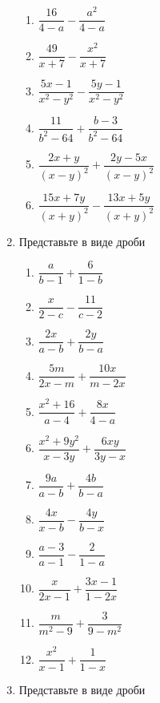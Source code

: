 \documentclass[10pt, a4paper]{article}
\begin{document}
\begin{enumerate}
	\begin{multicols}{3}
		\begin{enumerate}
			\item $\dfrac{16}{4-a}-\dfrac{a^2}{4-a}$ 
			\item $\dfrac{49}{x+7}-\dfrac{x^2}{x+7}$ 
			\item $\dfrac{5x-1}{x^2-y^2}-\dfrac{5y-1}{x^2-y^2}$ 
			\item $\dfrac{11}{b^2-64}+\dfrac{b-3}{b^2-64}$ 
			\item $\dfrac{2x+y}{(x-y)^2}+\dfrac{2y-5x}{(x-y)^2}$ 
			\item $\dfrac{15x+7y}{(x+y)^2}-\dfrac{13x+5y}{(x+y)^2}$ 
		\end{enumerate}	
	\end{multicols}
	\item Представьте в виде дроби
	\begin{multicols}{3}
		\begin{enumerate}
			\item $\dfrac{a}{b-1}+\dfrac{6}{1-b}$ 
			\item $\dfrac{x}{2-c}-\dfrac{11}{c-2}$ 
			\item $\dfrac{2x}{a-b}+\dfrac{2y}{b-a}$ 
			\item $\dfrac{5m}{2x-m}+\dfrac{10x}{m-2x}$ 
			\item $\dfrac{x^2+16}{a-4}+\dfrac{8x}{4-a}$ 
			\item $\dfrac{x^2+9y^2}{x-3y}+\dfrac{6xy}{3y-x}$ 
			\item $\dfrac{9a}{a-b}+\dfrac{4b}{b-a}$ 
			\item $\dfrac{4x}{x-b}-\dfrac{4y}{b-x}$ 
			\item $\dfrac{a-3}{a-1}-\dfrac{2}{1-a}$ 
			\item $\dfrac{x}{2x-1}+\dfrac{3x-1}{1-2x}$ 
			\item $\dfrac{m}{m^2-9}+\dfrac{3}{9-m^2}$ 
			\item $\dfrac{x^2}{x-1}+\dfrac{1}{1-x}$ 
		\end{enumerate}	
	\end{multicols}
	\item Представьте в виде дроби
	\begin{multicols}{3}

\end{multicols}
\end{enumerate}
\end{document}
